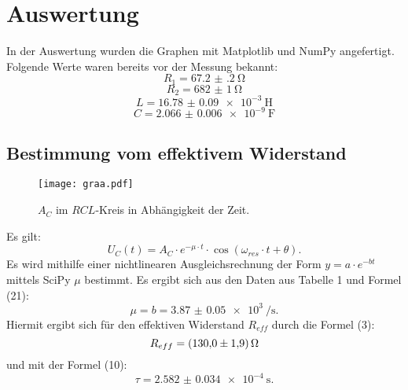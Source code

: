 \section{Auswertung}
\label{sec:Auswertung}
In der Auswertung wurden die Graphen mit Matplotlib \cite{matplotlib} und NumPy \cite{numpy} angefertigt.\\


Folgende Werte waren bereits vor der Messung bekannt:
\begin{displaymath}
R_1 = \SI{67.2(2)}{\ohm}
\end{displaymath}
\begin{displaymath}
R_2 = \SI{682(1)}{\ohm}
\end{displaymath}
\begin{displaymath}
L = \SI{16.78(9)e-3}{\henry}
\end{displaymath}
\begin{displaymath}
C = \SI{2.066(6)e-9}{\farad}
\end{displaymath}


\subsection{Bestimmung vom effektivem Widerstand}
\begin{figure}[H]
	\centering
	\caption{$A_C$ im $RCL$-Kreis in Abhängigkeit der Zeit.}
	\texttt{[image: graa.pdf]}
	\label{fig:graa}
\end{figure}

Es gilt:
\begin{equation}
	U_C(t) = A_C \cdot e^{-\mu \cdot t} \cdot \cos(\omega_{res} \cdot t + \theta)\text{.}
\end{equation}
Es wird mithilfe einer nichtlinearen Ausgleichsrechnung der Form $y=a\cdot e^{-b t}$ mittels SciPy \cite{scipy} $\mu$ bestimmt. Es ergibt sich aus den Daten aus Tabelle 1 und Formel (21):
\begin{displaymath}
\mu = b = \SI{3.87(5)e3}{\per\second}\text{.}
\end{displaymath}
Hiermit ergibt sich für den effektiven Widerstand $R_{eff}$ durch die Formel (3):
\begin{displaymath}
R_{eff} = \SI{130 \pm 1.9}{\ohm}
\end{displaymath}
und mit der Formel (10):
\begin{displaymath}
\tau = \SI{2.582(34)e-4}{\second}\text{.}
\end{displaymath}


